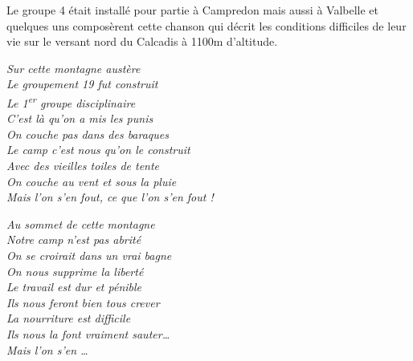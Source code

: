 Le groupe 4 était installé pour partie à Campredon mais aussi à Valbelle et quelques
uns composèrent cette chanson qui décrit les conditions difficiles de leur vie sur le
versant nord du Calcadis à 1100m d’altitude.


\newpage


\begin{center}

\begin{minipage}{0.43\textwidth}
\itshape
Sur cette montagne austère\\
Le groupement 19 fut construit\\
Le 1\textsuperscript{er} groupe disciplinaire\\
C’est là qu’on a mis les punis\\
On couche pas dans des baraques\\
Le camp c’est nous qu’on le construit\\
Avec des vieilles toiles de tente\\
On couche au vent et sous la pluie\\
Mais l’on s’en fout, ce que l’on s’en fout !
\end{minipage}
\hfill
\begin{minipage}{0.43\textwidth}
\itshape
Au sommet de cette montagne\\
Notre camp n’est pas abrité\\
On se croirait dans un vrai bagne\\
On nous supprime la liberté\\
Le travail est dur et pénible\\
Ils nous feront bien tous crever\\
La nourriture est difficile\\
Ils nous la font vraiment sauter…\\
Mais l’on s’en …
\end{minipage}

\vspace{1em}


\end{center}
